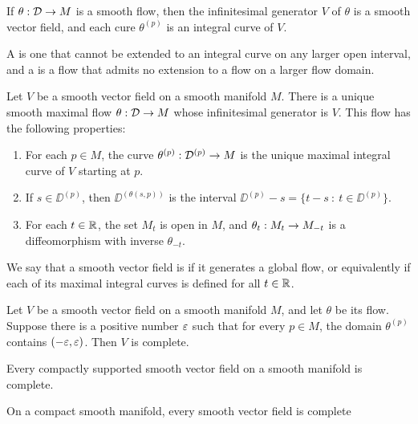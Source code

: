 \begin{prop}
If $\theta:\mathcal{D}\rightarrow M$ is a smooth flow, then the infinitesimal generator $V$ of $\theta$ is a smooth vector field, and each cure $\theta^{(p)}$ is an integral curve of $V$.
\end{prop}

\dfn A  is one that cannot be extended to an integral curve on any larger open interval, and a  is a flow that admits no extension to a flow on a larger flow domain.

\begin{thm}
Let $V$ be a smooth vector field on a smooth manifold $M$. There is a unique smooth maximal flow $\theta:\mathcal{D}\rightarrow M$ whose infinitesimal generator is $V$. This flow has the following properties:
\begin{enumerate}
    \item For each $p\in M$, the curve $\theta^{(p)}:\mathcal{D}^{(p)}\rightarrow M$ is the unique maximal integral curve of $V$ starting at $p$.
    \item If $s\in \DD^{(p)}$, then $\DD^{(\theta(s,p))}$ is the interval $\DD^{(p)} - s = \{t - s\ :\ t\in \DD^{(p)}\}$.
    \item For each $t\in \mathbb{R}$, the set $M_t$ is open in $M$, and $\theta_t:M_t\rightarrow M_{-t}$ is a diffeomorphism with inverse $\theta_{-t}$.
\end{enumerate}
\end{thm}

\dfn We say that a smooth vector field is  if it generates a global flow, or equivalently if each of its maximal integral curves is defined for all $t\in \mathbb{R}$.

\setcounter{thm}{14}

\begin{lem}
Let $V$ be a smooth vector field on a smooth manifold $M$, and let $\theta$ be its flow. Suppose there is a positive number $\varepsilon$ such that for every $p\in M$, the domain $\theta^{(p)}$ contains $(-\varepsilon,\varepsilon)$. Then $V$ is complete.
\end{lem}

\begin{thm}
Every compactly supported smooth vector field on a smooth manifold is complete.
\end{thm}

\begin{cor}
On a compact smooth manifold, every smooth vector field is complete
\end{cor}

